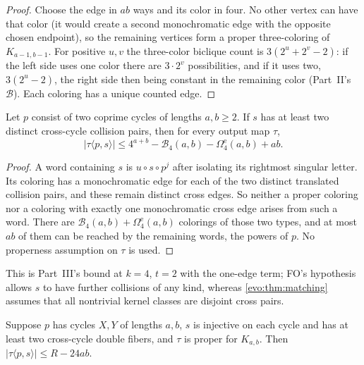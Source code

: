 \documentclass[11pt,a4paper]{article}
\numberwithin{equation}{section}
\theoremstyle{definition}
\theoremstyle{remark}
\newcommand{\Bip}{\mathcal B}
\begin{document}
\begin{proof}
Choose the edge in $ab$ ways and its color in four. No other vertex can have
that color (it would create a second monochromatic edge with the opposite
chosen endpoint), so the remaining vertices form a proper three-coloring of
$K_{a-1,b-1}$. For positive $u,v$ the three-color biclique count is
$3(2^u+2^v-2)$: if the left side uses one color there are $3\cdot2^v$
possibilities, and if it uses two, $3(2^u-2)$, the right side then being
constant in the remaining color (Part~II's $\Bip$). Each coloring has a unique
counted edge.
\end{proof}

\begin{proposition}\label{fo:fo:prop:penalty}
Let $p$ consist of two coprime cycles of lengths $a,b\ge2$. If $s$ has at
least two distinct cross-cycle collision pairs, then for every output map
$\tau$,
\begin{equation}\label{fo:fo:eq:penalty}
 |\tau\langle p,s\rangle|\le4^{a+b}-\Bip_4(a,b)-\Omega^{\mathrm e}_4(a,b)+ab.
\end{equation}
\end{proposition}

\begin{proof}
A word containing $s$ is $u\circ s\circ p^j$ after isolating its rightmost
singular letter. Its coloring has a monochromatic edge for each of the two
distinct translated collision pairs, and these remain distinct cross edges.
So neither a proper coloring nor a coloring with exactly one monochromatic
cross edge arises from such a word. There are $\Bip_4(a,b)+\Omega^{\mathrm e}_4(a,b)$
colorings of those two types, and at most $ab$ of them can be reached by the
remaining words, the powers of $p$. No properness assumption on $\tau$ is
used.
\end{proof}

This is Part~III's bound at $k=4$, $t=2$ with the one-edge term; FO's
hypothesis allows $s$ to have further collisions of any kind, whereas
\cref{evo:thm:matching} assumes that all nontrivial kernel classes are
disjoint cross pairs.

\begin{proposition}[A $24ab$ penalty; AS]\label{fo:as:prop:penalty}
Suppose $p$ has cycles $X,Y$ of lengths $a,b$, $s$ is injective on each cycle
and has at least two cross-cycle double fibers, and $\tau$ is proper for
$K_{a,b}$. Then $|\tau\langle p,s\rangle|\le R-24ab$.
\end{proposition}
\end{document}
